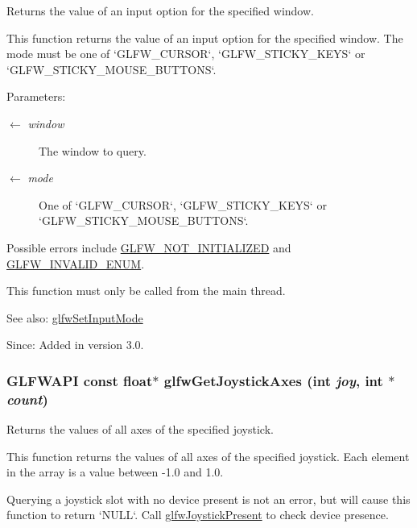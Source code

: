Returns the value of an input option for the specified window. 

This function returns the value of an input option for the specified window. The mode must be one of `GLFW\_\-CURSOR`, `GLFW\_\-STICKY\_\-KEYS` or `GLFW\_\-STICKY\_\-MOUSE\_\-BUTTONS`.

\begin{Desc}
\item[Parameters:]
\begin{description}
\item[\mbox{$\leftarrow$} {\em window}]The window to query. \item[\mbox{$\leftarrow$} {\em mode}]One of `GLFW\_\-CURSOR`, `GLFW\_\-STICKY\_\-KEYS` or `GLFW\_\-STICKY\_\-MOUSE\_\-BUTTONS`.\end{description}
\end{Desc}
Possible errors include \hyperlink{group__errors_g2374ee02c177f12e1fa76ff3ed15e14a}{GLFW\_\-NOT\_\-INITIALIZED} and \hyperlink{group__errors_g76f6bb9c4eea73db675f096b404593ce}{GLFW\_\-INVALID\_\-ENUM}.

This function must only be called from the main thread.

\begin{Desc}
\item[See also:]\hyperlink{group__input_ge1eb729d2dd91dc33fd60e150a6e1684}{glfwSetInputMode}\end{Desc}
\begin{Desc}
\item[Since:]Added in version 3.0. \end{Desc}
\hypertarget{group__input_gab9e573d808b088c5079c0f577d39448}{
\subsubsection[glfwGetJoystickAxes]{\setlength{\rightskip}{0pt plus 5cm}GLFWAPI const float$\ast$ glfwGetJoystickAxes (int {\em joy}, \/  int $\ast$ {\em count})}}
\label{group__input_gab9e573d808b088c5079c0f577d39448}


Returns the values of all axes of the specified joystick. 

This function returns the values of all axes of the specified joystick. Each element in the array is a value between -1.0 and 1.0.

Querying a joystick slot with no device present is not an error, but will cause this function to return `NULL`. Call \hyperlink{group__input_g7f81f22f355f4b7d315caf73cdfd9906}{glfwJoystickPresent} to check device presence.

